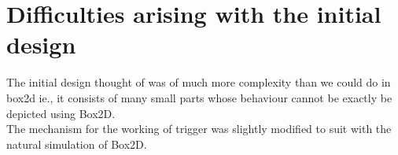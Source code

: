\documentclass[11pt]{article}
\begin{document}
\section{Difficulties arising with the initial design}
The initial design thought of was of much more complexity than we could do in box2d ie., it consists of many small parts whose behaviour cannot be exactly be depicted using Box2D.\\
The mechanism for the working of trigger was slightly modified to suit with the natural simulation of Box2D.



\end{document}
